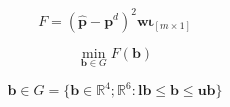 \begin{equation}\label{eq:objfct-nelson}
	F=\left(\bm{\hat{p}} - \bm{p}^d\right)^2 \bm{w}\bm{\iota}_{\left[m \times 1\right]}
\end{equation}

\begin{equation}
  \label{eq:objfct-nelsonmin}
  \min_{\bm{b} \in G} F(\bm{b})
\end{equation}

	
	 $$ \bm{b} \in G =   \{ \bm{b} \in \mathbb{R}^4 ; \mathbb{R}^6 : \mathbf{lb} \leq \bm{b} \leq \mathbf{ub}  \}$$



